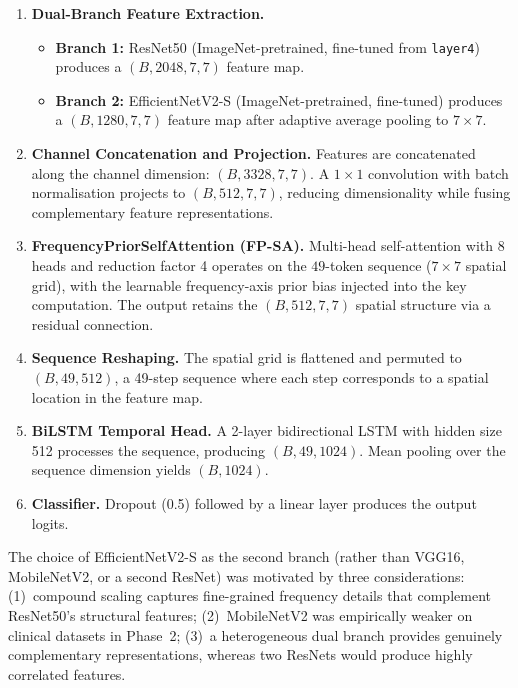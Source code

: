 \documentclass[oneside,openany]{final_report}
\begin{document}
\begin{enumerate}
    \item \textbf{Dual-Branch Feature Extraction.}
    \begin{itemize}[nosep]
        \item \textbf{Branch 1:} ResNet50 (ImageNet-pretrained, fine-tuned from \texttt{layer4}) produces a $(B, 2048, 7, 7)$ feature map.
        \item \textbf{Branch 2:} EfficientNetV2-S (ImageNet-pretrained, fine-tuned) produces a $(B, 1280, 7, 7)$ feature map after adaptive average pooling to $7 \times 7$.
    \end{itemize}

    \item \textbf{Channel Concatenation and Projection.} Features are concatenated along the channel dimension: $(B, 3328, 7, 7)$. A $1 \times 1$ convolution with batch normalisation projects to $(B, 512, 7, 7)$, reducing dimensionality while fusing complementary feature representations.

    \item \textbf{FrequencyPriorSelfAttention (FP-SA).} Multi-head self-attention with 8 heads and reduction factor 4 operates on the $49$-token sequence ($7 \times 7$ spatial grid), with the learnable frequency-axis prior bias injected into the key computation. The output retains the $(B, 512, 7, 7)$ spatial structure via a residual connection.

    \item \textbf{Sequence Reshaping.} The spatial grid is flattened and permuted to $(B, 49, 512)$, a 49-step sequence where each step corresponds to a spatial location in the feature map.

    \item \textbf{BiLSTM Temporal Head.} A 2-layer bidirectional LSTM with hidden size 512 processes the sequence, producing $(B, 49, 1024)$. Mean pooling over the sequence dimension yields $(B, 1024)$.

    \item \textbf{Classifier.} Dropout (0.5) followed by a linear layer produces the output logits.
\end{enumerate}

The choice of EfficientNetV2-S as the second branch (rather than VGG16, MobileNetV2, or a second ResNet) was motivated by three considerations: (1)~compound scaling captures fine-grained frequency details that complement ResNet50's structural features; (2)~MobileNetV2 was empirically weaker on clinical datasets in Phase~2; (3)~a heterogeneous dual branch provides genuinely complementary representations, whereas two ResNets would produce highly correlated features.
\end{document}
